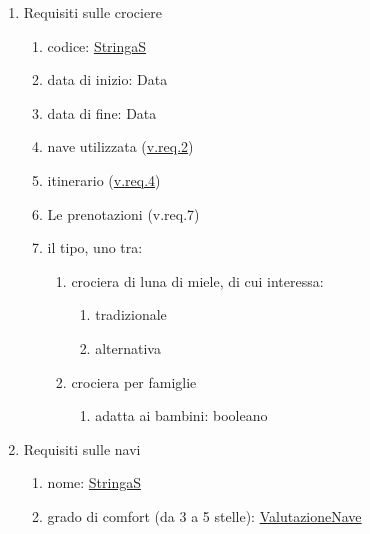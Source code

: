 \documentclass{article}
\begin{document}
\begin{enumerate}
    \item Requisiti sulle crociere\label{sec:RequisitiCrociera}
    \begin{enumerate}
        \item codice: \hyperref[sec:StringaS]{StringaS}\label{sec:RequisitiCrocieraCodice}
        \item data di inizio: Data\label{sec:RequisitiCrocieraDataInizio}
        \item data di fine: Data\label{sec:RequisitiCrocieraDataFine}
        \item nave utilizzata (\hyperref[sec:RequisitiNave]{v.req.2})\label{sec:RequisitiCrocieraNave}
        \item itinerario (\hyperref[sec:RequisitiItinerario]{v.req.4})\label{sec:RequisitiCrocieraItinerario}
        \item Le prenotazioni (v.req.7)\label{sec:RequisitiCrocieraPrenotazioni}
        \item il tipo, uno tra:\label{sec:RequisitiCrocieraTipo}
        \begin{enumerate}
            \item crociera di luna di miele, di cui interessa:\label{sec:RequisitiCrocieraTipoLunaDiMiele}
            \begin{enumerate}
                \item tradizionale\label{sec:RequisitiCrocieraTipoLunaDiMieleTradizionale}
                \item alternativa\label{sec:RequisitiCrocieraTipoLunaDiMieleAlternativa}
            \end{enumerate}
            \item crociera per famiglie\label{sec:RequisitiCrocieraTipoPerFamiglie}
            \begin{enumerate}
                \item adatta ai bambini: booleano\label{sec:RequisitiCrocieraTipoPerFamiglieAdattaAiBambini}
            \end{enumerate}
        \end{enumerate}
    \end{enumerate}
    \item Requisiti sulle navi\label{sec:RequisitiNave}
    \begin{enumerate}
        \item nome: \hyperref[sec:StringaS]{StringaS}\label{sec:RequisitiNaveNome}
        \item grado di comfort (da 3 a 5 stelle): \hyperref[sec:ValutazioneNave]{ValutazioneNave}\label{sec:RequisitiNaveGradoDiComfort}

\end{enumerate}
\end{enumerate}
\end{document}
